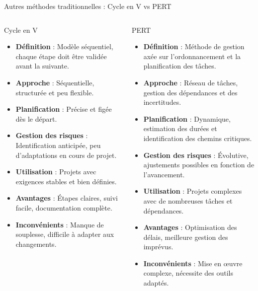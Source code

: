 \documentclass{beamer}
\begin{document}
\begin{frame}{\color{mypurple}Autres méthodes traditionnelles : Cycle en V vs PERT}
  \scriptsize
  \begin{columns}
    {
    \begin{block}{Cycle en V}
      \begin{itemize}
        \item \textbf{Définition} : Modèle séquentiel, chaque étape doit être validée avant la suivante.
        \item \textbf{Approche} : Séquentielle, structurée et peu flexible.
        \item \textbf{Planification} : Précise et figée dès le départ.
        \item \textbf{Gestion des risques} : Identification anticipée, peu d'adaptations en cours de projet.
        \item \textbf{Utilisation} : Projets avec exigences stables et bien définies.
        \item \textbf{Avantages} : Étapes claires, suivi facile, documentation complète.
        \item \textbf{Inconvénients} : Manque de souplesse, difficile à adapter aux changements.
      \end{itemize}
    \end{block}}
    {
    \begin{block}{PERT}
      \begin{itemize}
        \item \textbf{Définition} : Méthode de gestion axée sur l’ordonnancement et la planification des tâches.
        \item \textbf{Approche} : Réseau de tâches, gestion des dépendances et des incertitudes.
        \item \textbf{Planification} : Dynamique, estimation des durées et identification des chemins critiques.
        \item \textbf{Gestion des risques} : Évolutive, ajustements possibles en fonction de l’avancement.
        \item \textbf{Utilisation} : Projets complexes avec de nombreuses tâches et dépendances.
        \item \textbf{Avantages} : Optimisation des délais, meilleure gestion des imprévus.
        \item \textbf{Inconvénients} : Mise en œuvre complexe, nécessite des outils adaptés.
      \end{itemize}
    \end{block}}
  \end{columns}
\end{frame}
\end{document}
